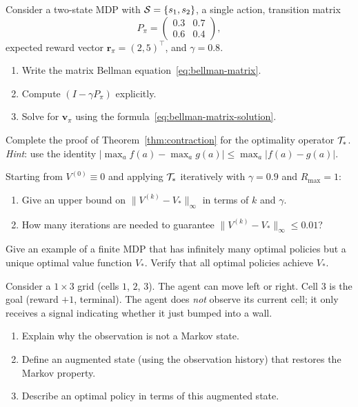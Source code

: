 \begin{exercise}
\label{ex:matrix-bellman}
Consider a two-state MDP with $\mathcal{S} = \{s_1, s_2\}$, a single action, transition matrix
\[
P_\pi = \begin{pmatrix} 0.3 & 0.7 \\ 0.6 & 0.4 \end{pmatrix},
\]
expected reward vector $\mathbf{r}_\pi = (2, 5)^\top$, and $\gamma = 0.8$.
\begin{enumerate}[label=(\alph*)]
  \item Write the matrix Bellman equation~\eqref{eq:bellman-matrix}.
  \item Compute $(I - \gamma P_\pi)$ explicitly.
  \item Solve for $\mathbf{v}_\pi$ using the formula~\eqref{eq:bellman-matrix-solution}.
\end{enumerate}
\end{exercise}

\begin{exercise}
\label{ex:contraction-star}
Complete the proof of Theorem~\ref{thm:contraction} for the optimality operator $\mathcal{T}_*$. \emph{Hint}: use the identity $|\max_a f(a) - \max_a g(a)| \le \max_a |f(a) - g(a)|$.
\end{exercise}

\begin{exercise}
\label{ex:convergence-rate}
Starting from $V^{(0)} \equiv 0$ and applying $\mathcal{T}_*$ iteratively with $\gamma = 0.9$ and $R_{\max} = 1$:
\begin{enumerate}[label=(\alph*)]
  \item Give an upper bound on $\|V^{(k)} - V_*\|_\infty$ in terms of $k$ and $\gamma$.
  \item How many iterations are needed to guarantee $\|V^{(k)} - V_*\|_\infty \le 0.01$?
\end{enumerate}
\end{exercise}

\begin{exercise}
\label{ex:optimal-policy-unique}
Give an example of a finite MDP that has infinitely many optimal policies but a unique optimal value function $V_*$. Verify that all optimal policies achieve $V_*$.
\end{exercise}

\begin{exercise}
\label{ex:pomdp-teaser}
Consider a $1 \times 3$ grid (cells $1$, $2$, $3$). The agent can move left or right. Cell $3$ is the goal (reward $+1$, terminal). The agent does \emph{not} observe its current cell; it only receives a signal indicating whether it just bumped into a wall.
\begin{enumerate}[label=(\alph*)]
  \item Explain why the observation is not a Markov state.
  \item Define an augmented state (using the observation history) that restores the Markov property.
  \item Describe an optimal policy in terms of this augmented state.
\end{enumerate}
\end{exercise}
